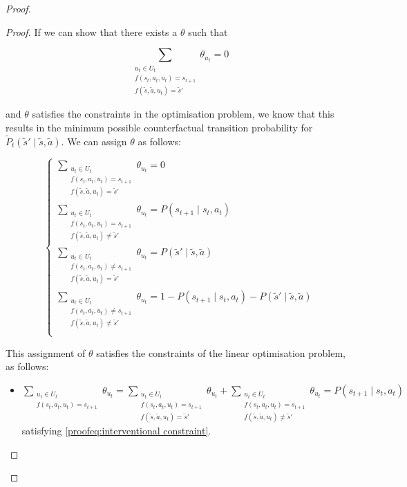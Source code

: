 \begin{proof}
\begin{proof}
If we can show that there exists a $\theta$ such that

\[
\sum_{\substack{u_t \in U_t \\f(s_t, a_t, u_t) = s_{t+1} \\ f(\tilde{s}, \tilde{a}, u_t) = \tilde{s}'}} \theta_{u_t} = 0
\]

and $\theta$ satisfies the constraints in the optimisation problem, we know that this results in the minimum possible counterfactual transition probability for $\tilde{P}_t(\tilde{s}' \mid \tilde{s}, \tilde{a})$. We can assign $\theta$ as follows:

\[
\begin{cases}
    \sum_{\substack{u_t \in U_t \\f(s_t, a_t, u_t) = s_{t+1} \\ f(\tilde{s}, \tilde{a}, u_t) = \tilde{s}'}} \theta_{u_t}= 0\\
    \sum_{\substack{u_t \in U_t \\f(s_t, a_t, u_t) = s_{t+1} \\ f(\tilde{s}, \tilde{a}, u_t) \neq \tilde{s}'}} \theta_{u_t} = P(s_{t+1} \mid s_t, a_t)\\
    \sum_{\substack{u_t \in U_t \\f(s_t, a_t, u_t) \neq s_{t+1} \\ f(\tilde{s}, \tilde{a}, u_t) = \tilde{s}'}} \theta_{u_t} = P(\tilde{s}' \mid \tilde{s}, \tilde{a})\\
    \sum_{\substack{u_t \in U_t \\f(s_t, a_t, u_t) \neq s_{t+1} \\ f(\tilde{s}, \tilde{a}, u_t) \neq \tilde{s}'}} \theta_{u_t} = 1 - P(s_{t+1} \mid s_t, a_t) - P(\tilde{s}' \mid \tilde{s}, \tilde{a})\\
\end{cases}
\]

This assignment of $\theta$ satisfies the constraints of the linear optimisation problem, as follows:

\begin{itemize}        
    \item $\sum_{\substack{u_t \in U_t \\f(s_t, a_t, u_t) = s_{t+1}}} \theta_{u_t} = \sum_{\substack{u_t \in U_t \\f(s_t, a_t, u_t) = s_{t+1} \\ f(\tilde{s}, \tilde{a}, u_t) = \tilde{s}'}} \theta_{u_t} + \sum_{\substack{u_t \in U_t \\f(s_t, a_t, u_t) = s_{t+1} \\ f(\tilde{s}, \tilde{a}, u_t) \neq \tilde{s}'}} \theta_{u_t} = P(s_{t+1} \mid s_t, a_t)$ \\satisfying \eqref{proofeq:interventional constraint}.


\end{itemize}
\end{proof}
\end{proof}
